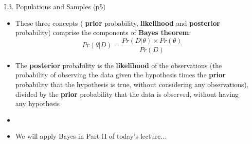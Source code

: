 \documentclass[handout]{beamer}
\newcommand{\strong}[1]{\textbf{\color{teal} #1}}
\newcommand{\stronger}[1]{\textbf{\color{purple} #1}}
\begin{document}
\begin{frame}{I.3. Populations and Samples (p5)}
\begin{itemize}
%
\item These three concepts (\strong{prior} probability, \strong{likelihood} and \strong{posterior} probability) comprise the components of \stronger{Bayes theorem}:
\[
	Pr(\theta|D) = \frac{ Pr(D|\theta) \times Pr(\theta) }{ Pr(D) }
\]
%
\item The \strong{posterior} probability is the \strong{likelihood} of the observations (the probability of observing the data given the hypothesis times the \strong{prior} probability that the hypothesis is true, without considering any observations), divided by the \strong{prior} probability that the data is observed, without having any hypothesis
\item[]
\item We will apply Bayes in Part II of today's lecture...
%
\end{itemize}
\end{frame}



\end{document}
